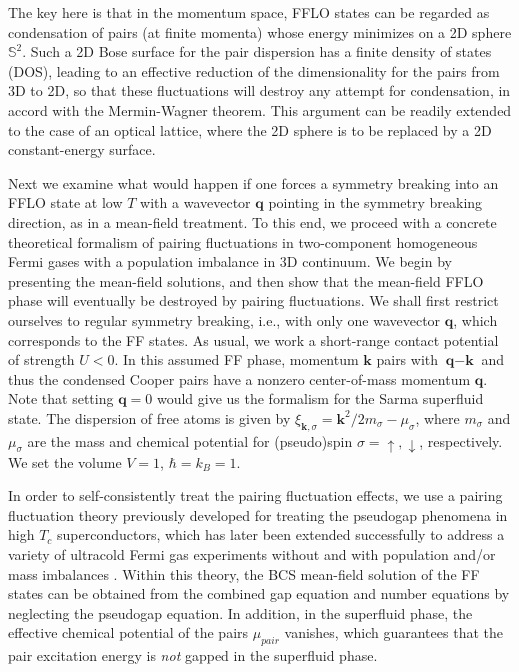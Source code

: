 \documentclass[aps,twocolumn,prl,tightenlines,floatfix]{revtex4-1}
\begin{document}
The key here is that in the momentum space, FFLO states can be
regarded as condensation of pairs (at finite momenta) whose energy
minimizes on a 2D sphere $\mathbb{S}^2$. Such a 2D Bose surface for
the pair dispersion has a finite density of states (DOS), leading to
an effective reduction of the dimensionality for the pairs from 3D to
2D, so that these fluctuations will destroy any attempt for
condensation, in accord with the Mermin-Wagner theorem. This argument
can be readily extended to the case of an optical lattice, where the
2D sphere is to be replaced by a 2D constant-energy surface.

Next we examine what would happen if one forces a symmetry breaking
into an FFLO state at low $T$ with a wavevector $\mathbf{q}$ pointing
in the symmetry breaking direction, as in a mean-field treatment.  To
this end, we proceed with a concrete theoretical formalism of pairing
fluctuations in two-component homogeneous Fermi gases with a
population imbalance in 3D continuum. We begin by presenting the
mean-field solutions, and then show that the mean-field FFLO phase
will eventually be destroyed by pairing fluctuations.
%
We shall first restrict ourselves to regular symmetry breaking, i.e.,
with only one wavevector $\mathbf{q}$, which corresponds to the FF
states.
%
As usual, we work a short-range contact potential of strength $U<0$.
In this assumed FF phase,
%
momentum $\textbf{k}$ pairs with $\textbf{q}-\textbf{k}$ and thus the
condensed Cooper pairs have a nonzero center-of-mass momentum
$\textbf{q}$. Note that setting $\textbf{q}=0$ would give us the
formalism for the Sarma superfluid state. The dispersion of free atoms
is given by $\xi_{\textbf{k},\sigma}=
\mathbf{k}^{2}/2m_{\sigma}-\mu_{\sigma}$, where $m_{\sigma}$ and
$\mu_{\sigma}$ are the mass and chemical potential for (pseudo)spin
$\sigma=\uparrow,\downarrow$, respectively.  We set the volume $V=1$,
$\hbar=k_{B}=1$.

In order to self-consistently treat the pairing fluctuation effects,
we use a pairing fluctuation theory previously developed \cite{Chen2}
for treating the pseudogap phenomena in high $T_c$ superconductors,
which has later been extended successfully to address a variety of
ultracold Fermi gas experiments without
\cite{Review,ReviewLTP-Full,OurRFReview} and with population
\cite{Chien06,chen07prb} and/or mass imbalances
\cite{Guo2009PRA,wang13pra}.  
%
Within this theory, the BCS mean-field solution of the FF states can
be obtained from the combined gap equation and number equations by
neglecting the pseudogap equation.  In addition, in the superfluid
phase, the effective chemical potential of the pairs $\mu_{pair}$
vanishes, which guarantees that the pair excitation energy is
\emph{not} gapped in the superfluid phase.
\end{document}
